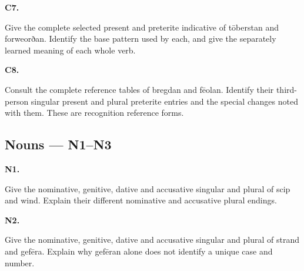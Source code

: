 \par\begin{minipage}{\linewidth}\raggedright
\textbf{C7.}

Give the complete selected present and preterite indicative of tōberstan and forweorðan. Identify the base pattern used by each, and give the separately learned meaning of each whole verb.

\end{minipage}\par\addvspace{4pt}

\par\begin{minipage}{\linewidth}\raggedright
\textbf{C8.}

Consult the complete reference tables of bregdan and fēolan. Identify their third-person singular present and plural preterite entries and the special changes noted with them. These are recognition reference forms.

\end{minipage}\par\addvspace{4pt}

\subsection*{Nouns — N1–N3}

\par\begin{minipage}{\linewidth}\raggedright
\textbf{N1.}

Give the nominative, genitive, dative and accusative singular and plural of scip and wind. Explain their different nominative and accusative plural endings.

\end{minipage}\par\addvspace{4pt}

\par\begin{minipage}{\linewidth}\raggedright
\textbf{N2.}

Give the nominative, genitive, dative and accusative singular and plural of strand and gefēra. Explain why gefēran alone does not identify a unique case and number.

\end{minipage}\par\addvspace{4pt}

